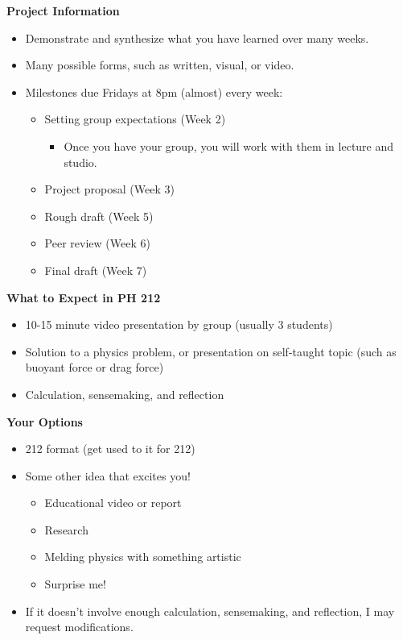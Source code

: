 \documentclass[]{article}
\begin{document}
\begin{PresentSpace}
\textbf{Project Information}
\begin{itemize}
	\item Demonstrate and synthesize what you have learned over many weeks.
	\item Many possible forms, such as written, visual, or video.
	\item Milestones due Fridays at 8pm (almost) every week:
	\begin{itemize}
		\item Setting group expectations (Week 2)
		\begin{itemize}
			\item Once you have your group, you will work with them in lecture and studio.
		\end{itemize}
		\item Project proposal (Week 3)
		\item Rough draft (Week 5)
		\item Peer review (Week 6)
		\item Final draft (Week 7)
	\end{itemize}
\end{itemize}
\textbf{What to Expect in PH 212}
\begin{itemize}
	\item 10-15 minute video presentation by group (usually 3 students)
	\item Solution to a physics problem, or presentation on self-taught topic (such as buoyant force or drag force)
	\item Calculation, sensemaking, and reflection
\end{itemize}
\textbf{Your Options}
\begin{itemize}
	\item 212 format (get used to it for 212)
	\item Some other idea that excites you!
	\begin{itemize}
		\item Educational video or report
		\item Research
		\item Melding physics with something artistic
		\item Surprise me!
	\end{itemize}
	\item If it doesn't involve enough calculation, sensemaking, and reflection, I may request modifications.
\end{itemize}
\end{PresentSpace}
\end{document}
